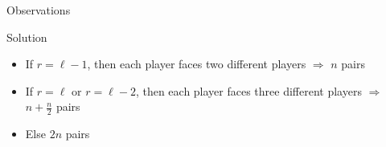 \begin{frame}
\begin{block}{Observations}
	\end{block}
	\pause
	\begin{block}{Solution}
		\begin{itemize}
			\item If $r = \ell - 1$, then each player faces two different players $\Longrightarrow$ $n$ pairs
			\pause
			\item If $r = \ell$ or $r = \ell - 2$, then each player faces three different players $\Longrightarrow$ $n + \frac{n}{2}$ pairs

			\pause
			\item Else $2n$ pairs
		\end{itemize}
	\end{block}
\end{frame}
